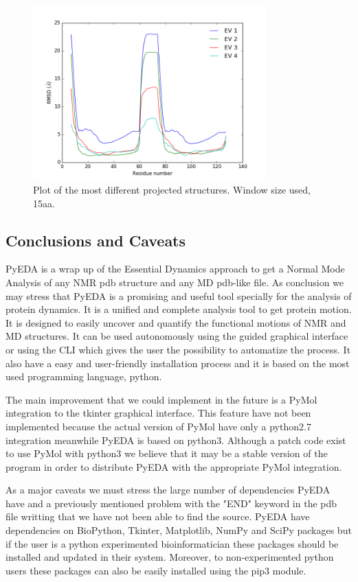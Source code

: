 \documentclass[12pt]{article}
\begin{document}
\begin{figure} [!h]
\centering
\includegraphics[width=0.8\textwidth]{1joy_residue}
\caption{Plot of the most different projected structures. Window size used, 15aa.}
\label{fig:1joy_residue}
\end{figure}
\subsection{Conclusions and Caveats}
PyEDA is a wrap up of the Essential Dynamics approach to get a Normal Mode Analysis of any NMR pdb structure and any MD pdb-like file. As conclusion we may stress that PyEDA is a promising and useful tool specially for the analysis of protein dynamics.  It is a unified and complete analysis tool to get protein motion. It is designed to easily uncover and quantify the functional motions of NMR and MD structures. It can be used autonomously using the guided graphical interface or using the CLI which gives the user the possibility to automatize the process. It also have a easy and user-friendly installation process and it is based on the most used programming language, python. 

The main improvement that we could implement in the future is a PyMol integration to the tkinter graphical interface. This feature have not been implemented because the actual version of PyMol have only a python2.7 integration meanwhile PyEDA is based on python3. Although a patch code exist to use PyMol with python3 we believe that it may be a stable version of the program in order to distribute PyEDA with the appropriate PyMol integration. 

As a major caveats we must stress the large number of dependencies PyEDA have and a previously mentioned problem with the "END" keyword in the pdb file writting that we have not been able to find the source. PyEDA have dependencies on  BioPython\citep{Cock2009}, Tkinter, Matplotlib\citep{Hunter2007}, NumPy and SciPy\citep{VanderWalt2011} packages but if the user is a python experimented bioinformatician these packages should be installed and updated in their system. Moreover, to non-experimented python users these packages can also be easily installed using the pip3 module. 
\end{document}
